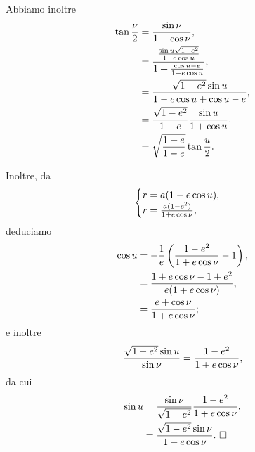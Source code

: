 \par Abbiamo inoltre
\begin{align*}
  \tan \frac{\nu}{2}
    &= \frac{\sin \nu}{1 + \cos \nu},\\
    &=  \frac{\frac{\sin{u}\sqrt{1 - e^2}}
          {1 - e \cos{u}}}
         {1 + \frac{\cos{u} - e}
          {1 - e \cos{u}}},\\
    &= \frac{\sqrt{1 - e^2} \sin u}
        {1 - e \cos u + \cos u
          -  e},\\
    &= \frac{\sqrt{1 - e^2}}{1 - e}
        \frac{\sin u}{1 + \cos u},\\
    &= \sqrt{\frac{1 + e}{1 - e}}
        \tan \frac{u}{2}.
\end{align*}
\par Inoltre, da
\[
  \begin{cases}
	  r = a(1 - e \cos{u}),\\
    r = \frac{a(1 - e^2)}
        {1 + e\cos{\nu}},
  \end{cases}
\]
deduciamo
\begin{align*}
  \cos u
  &= - \frac{1}{e} \left (
    \frac{1 - e^2}{1 + e \cos \nu}
    - 1 \right ),\\
  &= \frac{1 + e \cos \nu - 1 + e^2}
      {e(1 + e \cos \nu)},\\
  &= \frac{e + \cos \nu}
      {1 + e \cos \nu};
\end{align*}
e inoltre
\[
	  \frac{\sqrt{1 - e^2} \sin u}
      {\sin \nu}
    = \frac{1 - e^2}
      {1 + e\cos{\nu}},
\]
da cui
\begin{align*}
  \sin u
  &= \frac{\sin \nu}
      {\sqrt{1 - e^2}}
      \frac{1 - e^2}
      {1 + e\cos{\nu}},\\
  &= \frac{\sqrt{1 - e^2} \sin \nu}
      {1 + e\cos{\nu}}.\text{ $\square$}
\end{align*}
